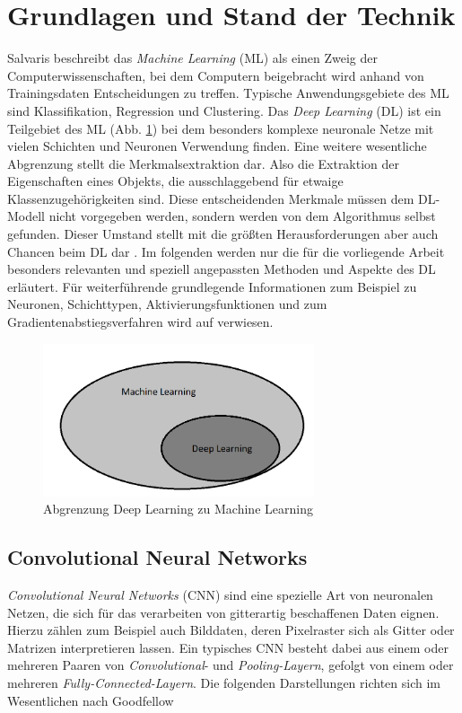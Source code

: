 \section{Grundlagen und Stand der Technik}

Salvaris beschreibt das \textit{Machine Learning} (ML) als einen Zweig der Computerwissenschaften, bei dem Computern beigebracht wird anhand von Trainingsdaten Entscheidungen zu treffen. Typische Anwendungsgebiete des ML sind Klassifikation, Regression und Clustering. Das \textit{Deep Learning} (DL) ist ein Teilgebiet des ML (Abb. \ref{dlmlunterschied}) bei dem besonders komplexe neuronale Netze mit vielen Schichten und Neuronen Verwendung finden. Eine weitere wesentliche Abgrenzung stellt die Merkmalsextraktion dar. Also die Extraktion der Eigenschaften eines Objekts, die ausschlaggebend für etwaige Klassenzugehörigkeiten sind. Diese entscheidenden Merkmale müssen dem DL-Modell nicht vorgegeben werden, sondern werden von dem Algorithmus selbst gefunden. Dieser Umstand stellt mit die größten Herausforderungen aber auch Chancen beim DL dar \cite[S.32-47]{dlazure2019}.  Im folgenden werden nur die für die vorliegende Arbeit besonders relevanten und speziell angepassten Methoden und Aspekte des DL erläutert. Für weiterführende grundlegende Informationen zum Beispiel zu Neuronen, Schichttypen, Aktivierungsfunktionen und zum Gradientenabstiegsverfahren wird auf \cite{dlbook2018} verwiesen. 
\begin{figure}[!h]
  \centering
  \includegraphics[width=8cm]{mldlunterschied.png}
  \caption{Abgrenzung Deep Learning zu Machine Learning}
  \label{dlmlunterschied}
\end{figure}

\subsection{Convolutional Neural Networks}

\textit{Convolutional Neural Networks} (CNN) sind eine spezielle Art von neuronalen Netzen, die sich für das verarbeiten von gitterartig beschaffenen Daten eignen. Hierzu zählen zum Beispiel auch Bilddaten, deren Pixelraster sich als Gitter oder Matrizen interpretieren lassen. Ein typisches CNN besteht dabei aus einem oder mehreren Paaren von \textit{Convolutional}- und \textit{Pooling-Layern}, gefolgt von einem oder mehreren \textit{Fully-Connected-Layern}. Die folgenden Darstellungen richten sich im Wesentlichen nach Goodfellow \cite[S.326-366]{Goodfellow-et-al-2016}

